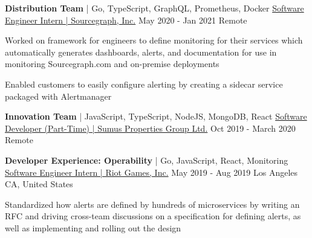 \begin{cventries}
  \cventry
    {\textbf{Distribution Team} | Go, TypeScript, GraphQL, Prometheus, Docker}
    {\href{https://bobheadxi.dev/experience/sourcegraph-intern}{Software Engineer Intern | Sourcegraph, Inc.}} %
    {May 2020 - Jan 2021} %
    {Remote} %
    {
      \begin{cvitems} %
        \item {Worked on framework for engineers to define monitoring for their services which automatically generates dashboards, alerts, and documentation for use in monitoring Sourcegraph.com and on-premise deployments}
        \item {Enabled customers to easily configure alerting by creating a sidecar service packaged with Alertmanager}
      \end{cvitems}
    }

  \cventry
    {\textbf{Innovation Team} | JavaScript, TypeScript, NodeJS, MongoDB, React}
    {\href{https://bobheadxi.dev/experience/sumus}{Software Developer (Part-Time) | Sumus Properties Group Ltd.}} %
    {Oct 2019 - March 2020} %
    {Remote} %
    {
    }
\vspace{-0.3cm}

  \cventry
    {\textbf{Developer Experience: Operability} | Go, JavaScript, React, Monitoring}
    {\href{https://bobheadxi.dev/experience/riot-games}{Software Engineer Intern | Riot Games, Inc.}} %
    {May 2019 - Aug 2019} %
    {Los Angeles CA, United States} %
    {
      \begin{cvitems} %
        \item {Standardized how alerts are defined by hundreds of microservices by writing an RFC and driving cross-team discussions on a specification for defining alerts, as well as implementing and rolling out the design}
      \end{cvitems}
    }


\end{cventries}

